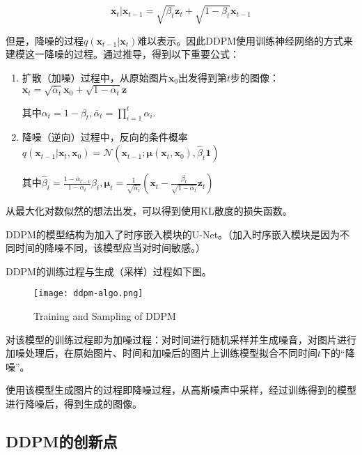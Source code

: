 \documentclass[a4paper]{article}
\begin{document}
\vspace{-1em}
$$\mathbf{x}_t|\mathbf{x}_{t-1}=\sqrt{\beta_t}\mathbf{z}_t+\sqrt{1-\beta_t}\mathbf{x}_{t-1}$$

\vspace{-0.5em}
但是，降噪的过程$q(\mathbf{x}_{t-1}|\mathbf{x}_{t})$难以表示。因此DDPM使用训练神经网络的方式来建模这一降噪的过程。通过推导，得到以下重要公式：

\begin{enumerate}
    \item 扩散（加噪）过程中，从原始图片$\mathbf{x}_0$出发得到第$t$步的图像：$\mathbf{x}_t=\sqrt{\overline{\alpha}_t}\mathbf{x}_0+\sqrt{1-\overline{\alpha}_t}\mathbf{z}$
    
    其中$\alpha_t=1-\beta_t,\overline{\alpha}_t=\prod_{i=1}^t\alpha_i$.
    \item 降噪（逆向）过程中，反向的条件概率$q(\mathbf{x}_{t-1}|\mathbf{x}_{t},\mathbf{x}_0)=\mathcal{N}\left(\mathbf{x}_{t-1};\boldsymbol{\mu}(\mathbf{x}_t,\mathbf{x}_0),\hat{\beta}_t\mathbf{1}\right)$
    
    其中$\hat{\beta}_t=\frac{1-\overline{\alpha}_{t-1}}{1-\overline{\alpha}_t}\beta_t,\boldsymbol{\mu}_t=\frac{1}{\sqrt{\overline{\alpha}_t}}\left(\mathbf{x}_t-\frac{\beta_t}{\sqrt{1-\overline{\alpha}_t}}\mathbf{z}_t\right)$
\end{enumerate}


从最大化对数似然的想法出发，可以得到使用KL散度的损失函数。

\vspace{1em}
DDPM的模型结构为加入了时序嵌入模块的U-Net。（加入时序嵌入模块是因为不同时间的降噪不同，该模型应当对时间敏感。）

DDPM的训练过程与生成（采样）过程如下图。
\vspace{-1em}
\begin{figure}[htb]
  \centering
  \texttt{[image: ddpm-algo.png]}
  \caption{Training and Sampling of DDPM \cite{ddpm}}
  \label{ddpm-pro}
\end{figure}

\vspace{-1em}
对该模型的训练过程即为加噪过程：对时间进行随机采样并生成噪音，对图片进行加噪处理后，在原始图片、时间和加噪后的图片上训练模型拟合不同时间$t$下的“降噪”。

使用该模型生成图片的过程即降噪过程，从高斯噪声中采样，经过训练得到的模型进行降噪后，得到生成的图像。

\subsection{DDPM的创新点}
\end{document}
